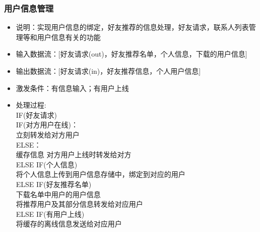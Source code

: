             \subsubsection{用户信息管理}
            \begin{itemize}
                \item 说明：实现用户信息的绑定，好友推荐的信息处理，好友请求，联系人列表管理等和用户信息有关的功能
                \item 输入数据流：[好友请求(out)，好友推荐名单，个人信息，下载的用户信息]
                \item 输出数据流：[好友请求(in)，好友推荐信息，个人用户信息]
                \item 激发条件：有信息输入；有用户上线
                \item 处理过程: \\
                IF(好友请求)\\
                    IF(对方用户在线)：\\
                        立刻转发给对方用户\\
                    ELSE：\\
                        缓存信息 对方用户上线时转发给对方\\
                ELSE IF(个人信息)\\
                    将个人信息上传到用户信息存储中，绑定到对应的用户\\
                ELSE IF(好友推荐名单)\\
                    下载名单中用户的用户信息\\
                    将推荐用户及其部分信息转发给对应用户\\
                ELSE IF(有用户上线)\\
                    将缓存的离线信息发送给对应用户\\
             \end{itemize}
